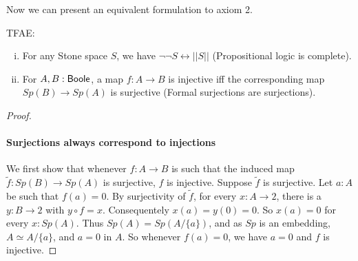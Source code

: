 Now we can present an equivalent formulation to axiom 2. 
\begin{lemma}
  TFAE:
  \begin{enumerate}[(i)]
    \item For any Stone space $S$, we have $\neg \neg S \leftrightarrow ||S||$ (Propositional logic is complete).
    \item For $A,B:\mathsf{Boole}$, a map $f:A\to B$ is injective iff the corresponding map $Sp(B) \to Sp(A)$ is surjective
      (Formal surjections are surjections). 
  \end{enumerate}
\end{lemma} 
\begin{proof}
\item \paragraph{Surjections always correspond to injections}
  We first show that whenever $f:A\to B$ is such that the induced map $\tilde f:Sp(B)\to Sp(A)$ is surjective, 
  $f$ is injective. Suppose $\tilde f $ is surjective. 
  Let $a:A$ be such that $f(a)= 0$. 
  By surjectivity of $\tilde f$, for every $x:A\to 2$, there is a $y:B\to 2$ with $y\circ f = x$. 
  Consequentely $x(a) = y(0) = 0$. So $x(a) = 0$ for every $x:Sp(A)$. 
  Thus $Sp(A) = Sp(A/\{a\})$, and as $Sp$ is an embedding, $A \simeq A/\{a\}$, and $a = 0$ in $A$. 
  So whenever $f(a) = 0$, we have $a=0$ and $f$ is injective. 



\end{proof}
